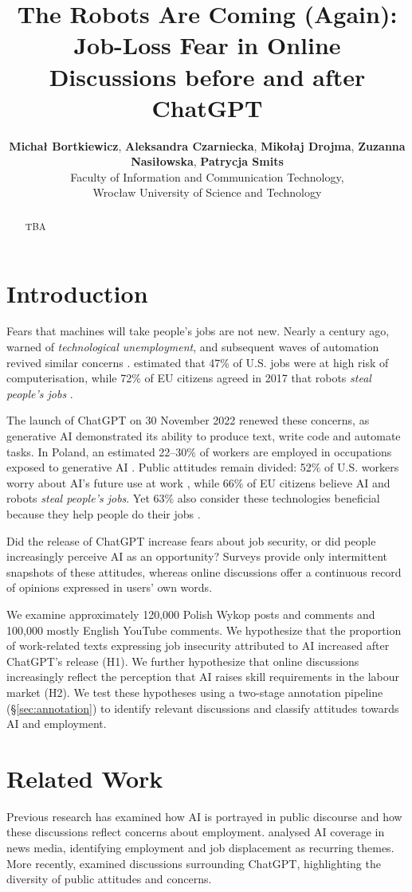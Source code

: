 \documentclass[11pt]{article}
\title{The Robots Are Coming (Again): Job-Loss Fear in Online Discussions before and after ChatGPT}
\author{
  \textbf{Michał Bortkiewicz},
  \textbf{Aleksandra Czarniecka},
  \textbf{Mikołaj Drojma},
  \textbf{Zuzanna Nasiłowska},
  \textbf{Patrycja Smits}  
  \\
  Faculty of Information and Communication Technology, \\
  Wrocław University of Science and Technology
}
\begin{document}
\maketitle
\begin{abstract}
TBA
\end{abstract}

\section{Introduction}

Fears that machines will take people's jobs are not new. Nearly a century ago, \citet{keynes1931} warned of \textit{technological unemployment}, and subsequent waves of automation revived similar concerns \citep{mokyr2015}. \citet{frey2017} estimated that 47\% of U.S. jobs were at high risk of computerisation, while 72\% of EU citizens agreed in 2017 that robots \textit{steal people's jobs} \citep{eurobarometer2017}.

The launch of ChatGPT on 30 November 2022 renewed these concerns, as generative AI demonstrated its ability to produce text, write code and automate tasks. In Poland, an estimated 22--30\% of workers are employed in occupations exposed to generative AI \citep{pie2024,ilonask2025}. Public attitudes remain divided: 52\% of U.S. workers worry about AI's future use at work \citep{pew2025}, while 66\% of EU citizens believe AI and robots \textit{steal people's jobs}. Yet 63\% also consider these technologies beneficial because they help people do their jobs \citep{eurobarometer2025}.

Did the release of ChatGPT increase fears about job security, or did people increasingly perceive AI as an opportunity? Surveys provide only intermittent snapshots of these attitudes, whereas online discussions offer a continuous record of opinions expressed in users' own words.

We examine approximately 120,000 Polish Wykop posts and comments and 100,000 mostly English YouTube comments. We hypothesize that the proportion of work-related texts expressing job insecurity attributed to AI increased after ChatGPT's release (H1). We further hypothesize that online discussions increasingly reflect the perception that AI raises skill requirements in the labour market (H2). We test these hypotheses using a two-stage annotation pipeline (\S\ref{sec:annotation}) to identify relevant discussions and classify attitudes towards AI and employment.
\section{Related Work}
Previous research has examined how AI is portrayed in public discourse and how these discussions reflect concerns about employment. \citet{fast2017} analysed AI coverage in news media, identifying employment and job displacement as recurring themes. More recently, \citet{xu2024} examined discussions surrounding ChatGPT, highlighting the diversity of public attitudes and concerns.
\end{document}

